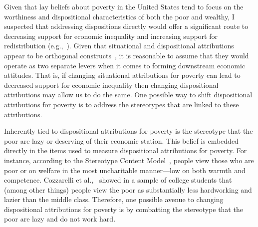 \documentclass{sfuthesis}
\begin{document}
Given that lay beliefs about poverty in the United States tend to focus on the worthiness and dispositional characteristics of both the poor and wealthy, I suspected that addressing dispositions directly would offer a significant route to decreasing support for economic inequality and increasing support for redistribution (e.g.,~\cite{cozzarelli01}). Given that situational and dispositional attributions appear to be orthogonal constructs~\cite{miller81, solomon78}, it is reasonable to assume that they would operate as two separate levers when it comes to forming downstream economic attitudes. That is, if changing situational attributions for poverty can lead to decreased support for economic inequality then changing dispositional attributions may allow us to do the same. One possible way to shift dispositional attributions for poverty is to address the stereotypes that are linked to these attributions.

Inherently tied to dispositional attributions for poverty is the stereotype that the poor are lazy or deserving of their economic station. This belief is embedded directly in the items used to measure dispositional attributions for poverty. For instance, according to the Stereotype Content Model~\cite{fiske02}, people view those who are poor or on welfare in the most uncharitable manner—low on both warmth and competence. Cozzarelli et al.,~\cite{cozzarelli01} showed in a sample of college students that (among other things) people view the poor as substantially less hardworking and lazier than the middle class. Therefore, one possible avenue to changing dispositional attributions for poverty is by combatting the stereotype that the poor are lazy and do not work hard. 
\end{document}
